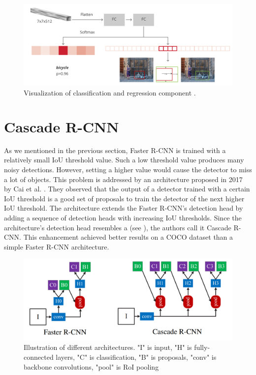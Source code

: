 \begin{figure}[h]
    \centering
    \includegraphics[width=0.95\linewidth]{Sources/Figures/rcnn-architecture.6732b9bd.png}
    \caption{Visualization of classification and regression component \cite{fasterrcnnhead}.}
    \label{fig:rcnn}
\end{figure}

\section{Cascade R-CNN}
As we mentioned in the previous section, Faster R-CNN is trained with a
relatively small IoU threshold value. Such a low threshold value produces many
noisy detections. However, setting a higher value would cause the detector
to miss a lot of objects. This problem is addressed by an architecture
proposed in 2017 by Cai et al. \cite{cascadercnn}. They observed that the
output of a detector trained with a certain IoU threshold is a good set
of proposals to train the detector of the next higher IoU threshold. The
architecture extends the Faster R-CNN's detection head by adding a sequence
of detection heads with increasing IoU thresholds. Since the architecture's
detection head resembles a  (see ),
the authors call it Cascade R-CNN. This enhancement achieved better results
on a COCO dataset \cite{coco} than a simple Faster R-CNN architecture.

\begin{figure}[h]
    \centering
    \includegraphics[width=0.85\linewidth]{Sources/Figures/cascade.png}
    \caption{Illustration of different architectures. "I" is input, "H" is
        fully-connected layers, "C" is classification, "B" is proposals, "conv" is
        backbone convolutions, "pool" is RoI pooling \cite{cascadercnn}}
    \label{fig:cascade}
\end{figure}

